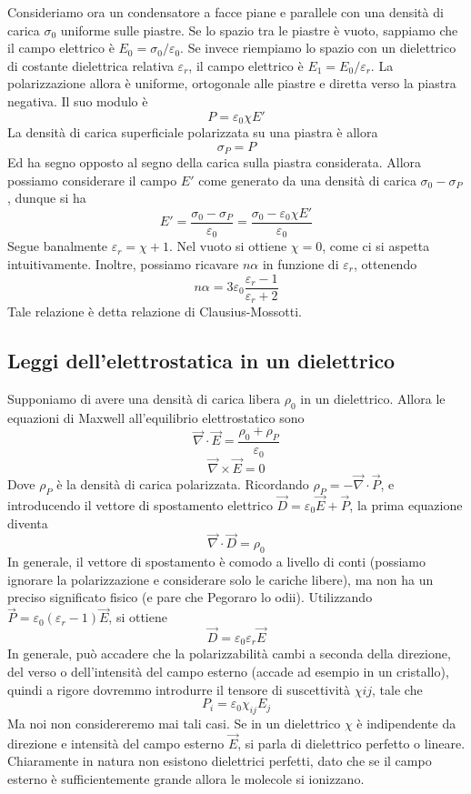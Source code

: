 \documentclass[a4paper,11pt]{book}
\let\oldnabla\nabla
\renewcommand{\nabla}{\vec{\oldnabla}}
\let\oldepsilon\epsilon
\let\oldvarepsilon\varepsilon
\renewcommand{\epsilon}{\oldvarepsilon}
\renewcommand{\varepsilon}{\oldepsilon}
\theoremstyle{definition}
\theoremstyle{theorem}
\begin{document}
Consideriamo ora un condensatore a facce piane e parallele con una densità di carica $\sigma_0$ uniforme sulle piastre. Se lo spazio tra le piastre è vuoto, sappiamo che il campo elettrico è $E_0=\sigma_0/\epsilon_0$. Se invece riempiamo lo spazio con un dielettrico di costante dielettrica relativa $\epsilon_r$, il campo elettrico è $E_1=E_0/\epsilon_r$. La polarizzazione allora è uniforme, ortogonale alle piastre e diretta verso la piastra negativa. Il suo modulo è
\[P=\epsilon_0\chi E'\]
La densità di carica superficiale polarizzata su una piastra è allora
\[\sigma_P=P\]
Ed ha segno opposto al segno della carica sulla piastra considerata. Allora possiamo considerare il campo $E'$ come generato da una densità di carica $\sigma_0-\sigma_P$, dunque si ha
\[E'=\frac{\sigma_0-\sigma_P}{\epsilon_0}=\frac{\sigma_0-\epsilon_0\chi E'}{\epsilon_0}\]
Segue banalmente $\epsilon_r=\chi+1$. Nel vuoto si ottiene $\chi=0$, come ci si aspetta intuitivamente. Inoltre, possiamo ricavare $n\alpha$ in funzione di $\epsilon_r$, ottenendo
\[n\alpha=3\epsilon_0\frac{\epsilon_r-1}{\epsilon_r+2}\]
Tale relazione è detta relazione di Clausius-Mossotti. 
\subsection{Leggi dell'elettrostatica in un dielettrico}
Supponiamo di avere una densità di carica libera $\rho_0$ in un dielettrico. Allora le equazioni di Maxwell all'equilibrio elettrostatico sono
\[\nabla\cdot\vec{E}=\frac{\rho_0+\rho_P}{\epsilon_0}\]
\[\nabla\times\vec{E}=0\]
Dove $\rho_P$ è la densità di carica polarizzata. Ricordando $\rho_P=-\nabla\cdot\vec{P}$, e introducendo il vettore di spostamento elettrico $\vec{D}=\epsilon_0\vec{E}+\vec{P}$, la prima equazione diventa
\[\nabla\cdot\vec{D}=\rho_0\]
In generale, il vettore di spostamento è comodo a livello di conti (possiamo ignorare la polarizzazione e considerare solo le cariche libere), ma non ha un preciso significato fisico (e pare che Pegoraro lo odii). Utilizzando $\vec{P}=\epsilon_0(\epsilon_r-1)\vec{E}$, si ottiene
\[\vec{D}=\epsilon_0\epsilon_r\vec{E}\]
In generale, può accadere che la polarizzabilità cambi a seconda della direzione, del verso o dell'intensità del campo esterno (accade ad esempio in un cristallo), quindi a rigore dovremmo introdurre il tensore di suscettività $\chi{ij}$, tale che
\[P_i=\epsilon_0\chi_{ij}E_j\]
Ma noi non considereremo mai tali casi. Se in un dielettrico $\chi$ è indipendente da direzione e intensità del campo esterno $\vec{E}$, si parla di dielettrico perfetto o lineare. Chiaramente in natura non esistono dielettrici perfetti, dato che se il campo esterno è sufficientemente grande allora le molecole si ionizzano.
\end{document}
